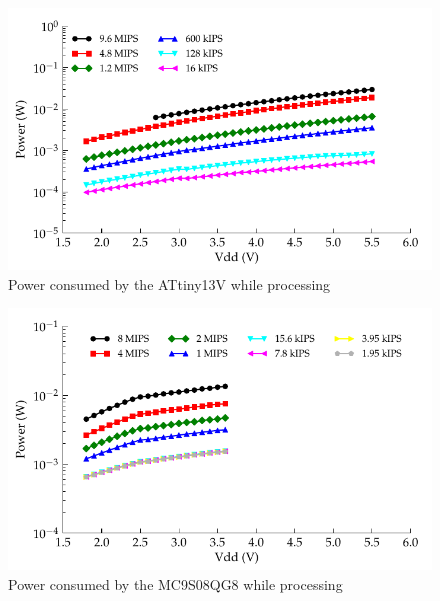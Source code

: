 \begin{figure}
\begin{centering}
\includegraphics{content/pt1/02-Microcontrollers/graphics/Graph_ATtiny13V_Clock_Power}
\par\end{centering}

\protect\caption{\label{graph:CLK_POWER_ATtiny13V}Power consumed by the ATtiny13V
while processing}
\end{figure}
\begin{figure}
\begin{centering}
\includegraphics{content/pt1/02-Microcontrollers/graphics/Graph_MC9S08QG8_Clock_Power}
\par\end{centering}

\protect\caption{\label{graph:CLK_POWER_MC9S08QG8}Power consumed by the MC9S08QG8
while processing}
\end{figure}


